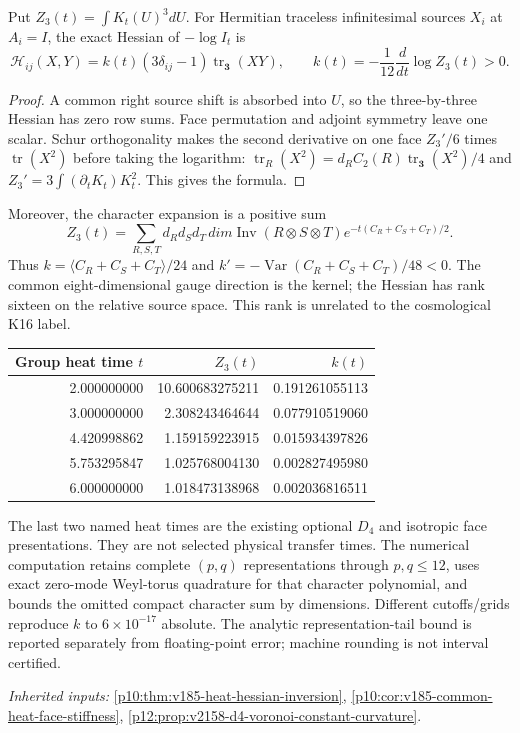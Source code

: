 \documentclass[12pt,a4paper]{article}
\begin{document}
Put $Z_3(t)=\int K_t(U)^3dU$. For Hermitian traceless infinitesimal
sources $X_i$ at $A_i=I$, the exact Hessian of $-\log I_t$ is
\[
 \boxed{\mathcal H_{ij}(X,Y)=
 k(t)(3\delta_{ij}-1)\operatorname{tr}_{\mathbf3}(XY),\qquad
 k(t)=-\frac1{12}\frac{d}{dt}\log Z_3(t)>0.}
\]
\begin{proof}
A common right source shift is absorbed into $U$, so the
three-by-three Hessian has zero row sums. Face permutation and adjoint
symmetry leave one scalar. Schur orthogonality makes the second derivative
on one face $Z_3'/6$ times $\operatorname{tr}(X^2)$ before taking
the logarithm: $\operatorname{tr}_R(X^2)
=d_RC_2(R)\operatorname{tr}_{\mathbf3}(X^2)/4$ and
$Z_3'=3\int(\partial_tK_t)K_t^2$. This gives the formula.
\end{proof}
Moreover, the character expansion is a positive sum
\[
 Z_3(t)=\sum_{R,S,T}d_Rd_Sd_T\,dim\operatorname{Inv}(R\otimes S\otimes T)
 e^{-t(C_R+C_S+C_T)/2}.
\]
Thus $k=\langle C_R+C_S+C_T\rangle/24$ and
$k'=-\operatorname{Var}(C_R+C_S+C_T)/48<0$.
The common eight-dimensional gauge direction is the kernel; the Hessian
has rank sixteen on the relative source space. This rank is unrelated to
the cosmological K16 label.

\begin{center}\small\begin{tabular}{@{}rrr@{}}\toprule Group heat time $t$ & $Z_3(t)$ & $k(t)$\\\midrule
2.000000000 & 10.600683275211 & 0.191261055113\\
3.000000000 & 2.308243464644 & 0.077910519060\\
4.420998862 & 1.159159223915 & 0.015934397826\\
5.753295847 & 1.025768004130 & 0.002827495980\\
6.000000000 & 1.018473138968 & 0.002036816511\\
\bottomrule\end{tabular}\end{center}
The last two named heat times are the existing optional $D_4$ and isotropic
face presentations. They are not selected physical transfer times.
The numerical computation retains complete $(p,q)$ representations through
$p,q\le12$, uses exact zero-mode Weyl-torus quadrature for that character
polynomial, and bounds the omitted compact character sum by dimensions.
Different cutoffs/grids reproduce $k$ to $6\times10^{-17}$ absolute.
The analytic representation-tail bound is reported separately from
floating-point error; machine rounding is not interval certified.
\par\noindent\textit{Inherited inputs:} \ref{p10:thm:v185-heat-hessian-inversion}, \ref{p10:cor:v185-common-heat-face-stiffness}, \ref{p12:prop:v2158-d4-voronoi-constant-curvature}.
\end{document}
